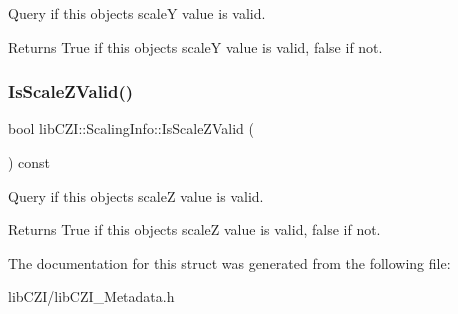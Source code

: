 Query if this object\textquotesingle{}s scaleY value is valid.

\begin{DoxyReturn}{Returns}
True if this object\textquotesingle{}s scaleY value is valid, false if not. 
\end{DoxyReturn}
\mbox{\label{structlib_c_z_i_1_1_scaling_info_a9dcd0b6f35c61e3611a415691ff427a7}} 
\subsubsection{\texorpdfstring{Is\+Scale\+Z\+Valid()}{IsScaleZValid()}}
{\footnotesize\ttfamily bool lib\+C\+Z\+I\+::\+Scaling\+Info\+::\+Is\+Scale\+Z\+Valid (\begin{DoxyParamCaption}{ }\end{DoxyParamCaption}) const\hspace{0.3cm}{\ttfamily [inline]}}

Query if this object\textquotesingle{}s scaleZ value is valid.

\begin{DoxyReturn}{Returns}
True if this object\textquotesingle{}s scaleZ value is valid, false if not. 
\end{DoxyReturn}


The documentation for this struct was generated from the following file\+:\begin{DoxyCompactItemize}
\item 
lib\+C\+Z\+I/lib\+C\+Z\+I\+\_\+\+Metadata.\+h\end{DoxyCompactItemize}

